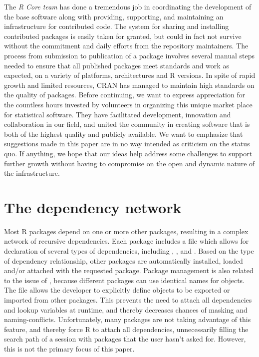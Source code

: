 The \emph{R Core team} has done a tremendous job in coordinating the
development of the base software along with providing, supporting, and maintaining an
infrastructure for contributed code. The system for sharing and installing
contributed packages is easily taken for granted, but could in fact not
survive without the commitment and daily efforts from the repository
maintainers. The process from submission to publication of a package involves
several manual steps needed to ensure that all published packages
meet standards and work as expected, on a variety of platforms, architectures
and R versions. In spite of rapid growth and limited resources, CRAN has
managed to maintain high standards on the quality of packages. Before
continuing, we want to express appreciation for the countless hours invested
by volunteers in organizing this unique market place for statistical software.
They have facilitated development, innovation and collaboration in our field,
and united the community in creating software that is both of the highest
quality and publicly available. We want to emphasize that suggestions made in
this paper are in no way intended as criticism on the status quo. If anything,
we hope that our ideas help address some challenges to support further growth
without having to compromise on the open and dynamic nature of the
infrastructure.

\section{The dependency network}

Most R packages depend on one or more other packages, resulting in a complex
network of recursive dependencies. Each package includes a 
file which allows for declaration of several types of dependencies, including
, ,  and . Based on
the type of dependency relationship, other packages are automatically
installed, loaded and/or attached with the requested package. Package
management is also related to the issue of , because different
packages can use identical names for objects. The  file allows
the developer to explicitly define objects to be exported or imported from
other packages. This prevents the need to attach all dependencies and lookup
variables at runtime, and thereby decreases chances of masking and
naming-conflicts. Unfortunately, many packages are not taking advantage of this
feature, and thereby force R to attach all dependencies, unnecessarily filling
the search path of a session with packages that the user hasn't asked for.
However, this is not the primary focus of this paper.

